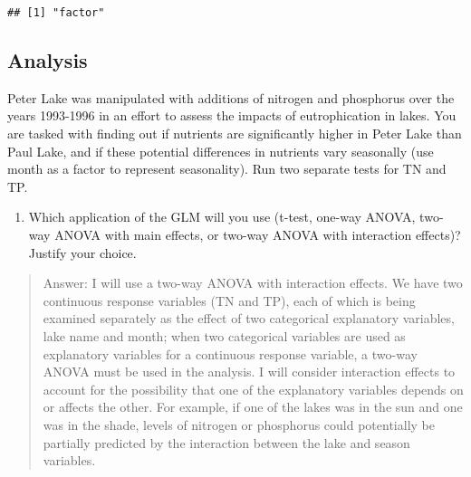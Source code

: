 \documentclass[]{article}
\newenvironment{Shaded}{\begin{snugshade}}{\end{snugshade}}
\newcommand{\DecValTok}[1]{\textcolor[rgb]{0.00,0.00,0.81}{#1}}
\newcommand{\KeywordTok}[1]{\textcolor[rgb]{0.13,0.29,0.53}{\textbf{#1}}}
\newcommand{\NormalTok}[1]{#1}
\newcommand{\OperatorTok}[1]{\textcolor[rgb]{0.81,0.36,0.00}{\textbf{#1}}}
\newcommand{\StringTok}[1]{\textcolor[rgb]{0.31,0.60,0.02}{#1}}
\providecommand{\tightlist}{%
  \setlength{\itemsep}{0pt}\setlength{\parskip}{0pt}}
\begin{document}
\begin{Shaded}
\end{Shaded}

\begin{verbatim}
## [1] "factor"
\end{verbatim}

\hypertarget{analysis}{%
\subsection{Analysis}\label{analysis}}

Peter Lake was manipulated with additions of nitrogen and phosphorus
over the years 1993-1996 in an effort to assess the impacts of
eutrophication in lakes. You are tasked with finding out if nutrients
are significantly higher in Peter Lake than Paul Lake, and if these
potential differences in nutrients vary seasonally (use month as a
factor to represent seasonality). Run two separate tests for TN and TP.

\begin{enumerate}
\def\labelenumi{\arabic{enumi}.}
\setcounter{enumi}{3}
\tightlist
\item
  Which application of the GLM will you use (t-test, one-way ANOVA,
  two-way ANOVA with main effects, or two-way ANOVA with interaction
  effects)? Justify your choice.
\end{enumerate}

\begin{quote}
Answer: I will use a two-way ANOVA with interaction effects. We have two
continuous response variables (TN and TP), each of which is being
examined separately as the effect of two categorical explanatory
variables, lake name and month; when two categorical variables are used
as explanatory variables for a continuous response variable, a two-way
ANOVA must be used in the analysis. I will consider interaction effects
to account for the possibility that one of the explanatory variables
depends on or affects the other. For example, if one of the lakes was in
the sun and one was in the shade, levels of nitrogen or phosphorus could
potentially be partially predicted by the interaction between the lake
and season variables.
\end{quote}
\end{document}
